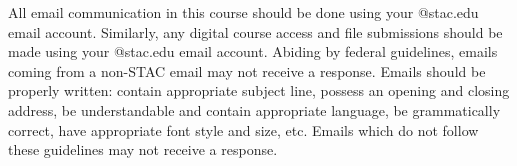 \documentclass[11pt,letterpaper]{article}
\begin{document}
%
%



All email communication in this course should be done using your @stac.edu email account. Similarly, any digital course access and file submissions should be made using your @stac.edu email account. Abiding by federal guidelines, emails coming from a non-STAC email may not receive a response. Emails should be properly written: contain appropriate subject line, possess an opening and closing address, be understandable and contain appropriate language, be grammatically correct, have appropriate font style and size, etc. Emails which do not follow these guidelines may not receive a response.
\sectionbreak
\end{document}
